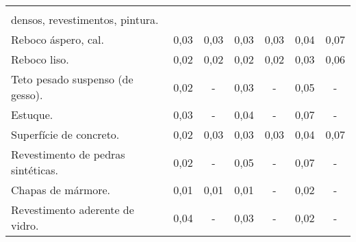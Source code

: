 \begin{anexosenv}
\begin{center}
\begin{longtable}{l|c|c|c|c|c|c}
\begin{tabular}[c]{@{}l@{}}Materiais de construção, usuais, \\ densos, revestimentos, pintura.\end{tabular}                                                                                                       &      &      &      &       &      &      \\
Reboco áspero, cal.                                                                                                                                                                                               & 0,03 & 0,03 & 0,03 & 0,03  & 0,04 & 0,07 \\
Reboco liso.                                                                                                                                                                                                      & 0,02 & 0,02 & 0,02 & 0,02  & 0,03 & 0,06 \\
Teto pesado suspenso (de gesso).                                                                                                                                                                                  & 0,02 & -    & 0,03 & -     & 0,05 & -    \\
Estuque.                                                                                                                                                                                                          & 0,03 & -    & 0,04 & -     & 0,07 & -    \\
Superfície de concreto.                                                                                                                                                                                           & 0,02 & 0,03 & 0,03 & 0,03  & 0,04 & 0,07 \\
Revestimento de pedras sintéticas.                                                                                                                                                                                & 0,02 & -    & 0,05 & -     & 0,07 & -    \\
Chapas de mármore.                                                                                                                                                                                                & 0,01 & 0,01 & 0,01 & -     & 0,02 & -    \\
Revestimento aderente de vidro.                                                                                                                                                                                   & 0,04 & -    & 0,03 & -     & 0,02 & -    \\

\end{longtable}
\end{center}
\end{anexosenv}
